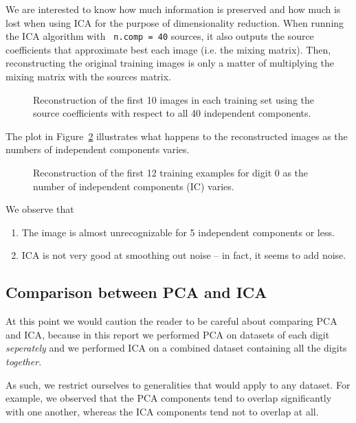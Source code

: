 \documentclass[12pt,article,oneside]{memoir}
\newcommand{\func}[1]{\texttt{\color{red} #1}}
\begin{document}
We are interested to know how much information is preserved and how much is lost when using ICA for the purpose of dimensionality reduction. When running the ICA algorithm with \func{n.comp = 40} sources, it also outputs the source coefficients that approximate best each image (i.e. the mixing matrix). Then, reconstructing the original training images is only a matter of multiplying the mixing matrix with the sources matrix.

\begin{figure}[H]
	\caption{Reconstruction of the first 10 images in each training set using the source coefficients with respect to all 40 independent components.}
	\label{fig:ica-reconstruction}
\end{figure}

The plot in Figure~\ref{fig:ica-reconstruction-gradual-digit-0} illustrates what happens to the reconstructed images as the numbers of independent components varies.

\begin{figure}[H]
	\caption{Reconstruction of the first 12 training examples for digit 0 as the number of independent components (IC) varies.}
	\label{fig:ica-reconstruction-gradual-digit-0}
\end{figure}

We observe that
\begin{enumerate}
	\item The image is almost unrecognizable for 5 independent components or less.
	\item ICA is not very good at smoothing out noise -- in fact, it seems to add noise.

\end{enumerate}

\subsection{Comparison between PCA and ICA}

At this point we would caution the reader to be careful about comparing PCA and ICA, because in this report we performed PCA on datasets of each digit \emph{seperately} and we performed ICA on a combined dataset containing all the digits \emph{together}.

As such, we restrict ourselves to generalities that would apply to any dataset. For example, we observed that the PCA components tend to overlap significantly with one another, whereas the ICA components tend not to overlap at all.
\end{document}
